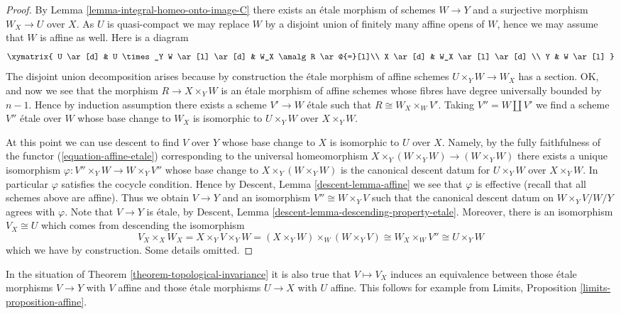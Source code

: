 \begin{proof}
\medskip\noindent
By
Lemma \ref{lemma-integral-homeo-onto-image-C}
there exists an \'etale morphism of schemes $W \to Y$ and a
surjective morphism $W_X \to U$ over $X$.
As $U$ is quasi-compact we may replace $W$ by a disjoint union of
finitely many affine opens of $W$, hence we may assume that $W$
is affine as well. Here is a diagram
$$
\xymatrix{
U \ar[d] & U \times_Y W \ar[l] \ar[d] & W_X \amalg R \ar@{=}[l]\\
X \ar[d] & W_X \ar[l] \ar[d] \\
Y & W \ar[l]
}
$$
The disjoint union decomposition arises because by construction the
\'etale morphism of affine schemes $U \times_Y W \to W_X$ has a section.
OK, and now we see that the morphism $R \to X \times_Y W$ is an \'etale
morphism of affine schemes whose fibres have degree universally bounded
by $n - 1$. Hence by induction assumption there exists a scheme
$V' \to W$ \'etale such that $R \cong W_X \times_W V'$.
Taking $V'' = W \amalg V'$ we find a scheme $V''$ \'etale over $W$ whose
base change to $W_X$ is isomorphic to $U \times_Y W$
over $X \times_Y W$.

\medskip\noindent
At this point we can use descent to find $V$ over $Y$ whose base
change to $X$ is isomorphic to $U$ over $X$. Namely, by the fully
faithfulness of the functor (\ref{equation-affine-etale})
corresponding to the universal homeomorphism
$X \times_Y (W \times_Y W) \to (W \times_Y W)$
there exists a unique isomorphism $\varphi : V'' \times_Y W \to W \times_Y V''$
whose base change to $X \times_Y (W \times_Y W)$ is the canonical
descent datum for $U \times_Y W$ over $X \times_Y W$. In particular
$\varphi$ satisfies the cocycle condition. Hence by
Descent, Lemma \ref{descent-lemma-affine}
we see that $\varphi$ is effective (recall that all schemes above are affine).
Thus we obtain $V \to Y$ and an isomorphism $V'' \cong W \times_Y V$
such that the canonical descent datum on $W \times_Y V/W/Y$ agrees
with $\varphi$. Note that $V \to Y$ is \'etale, by
Descent, Lemma \ref{descent-lemma-descending-property-etale}.
Moreover, there is an isomorphism $V_X \cong U$ which comes from
descending the isomorphism
$$
V_X \times_X W_X =
X \times_Y V \times_Y W =
(X \times_Y W) \times_W (W \times_Y V) \cong
W_X  \times_W V'' \cong U \times_Y W
$$
which we have by construction. Some details omitted.
\end{proof}

\begin{remark}
\label{remark-affine-inside-equivalence}
In the situation of
Theorem \ref{theorem-topological-invariance}
it is also true that $V \mapsto V_X$ induces an equivalence
between those \'etale morphisms $V \to Y$ with $V$ affine and
those \'etale morphisms $U \to X$ with $U$ affine.
This follows for example from
Limits, Proposition \ref{limits-proposition-affine}.
\end{remark}







